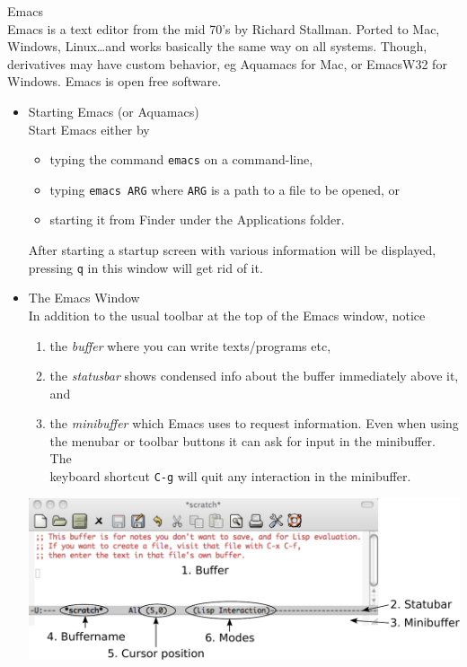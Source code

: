 \documentclass[a4,landscape]{seminar}
\begin{document}
\begin{slide}
  {\Large Emacs}\\[1ex]
  Emacs is a text editor from the mid 70's by Richard Stallman. Ported to Mac, Windows, Linux\dots and works basically the same way on all systems. Though, derivatives may have custom behavior, eg Aquamacs for Mac, or EmacsW32 for Windows. Emacs is open free software.
\begin{itemize}
  \item Starting Emacs (or Aquamacs)\\[1ex]
    Start Emacs either by
    \begin{itemize}
    \item typing the command \texttt{emacs} on a command-line,
    \item typing \texttt{emacs ARG} where \texttt{ARG} is a path to a file to be opened, or
    \item starting it from Finder under the Applications folder.
    \end{itemize}
    After starting a startup screen with various information will be
    displayed, pressing \texttt{q} in this window will get rid of it.
    \clearpage{}
  \item The Emacs Window\\[1ex]
    In addition to the usual toolbar at the top of the Emacs window, notice
    \begin{enumerate}
    \item the \emph{buffer} where you can write texts/programs etc,
    \item the \emph{statusbar} shows condensed info about the buffer immediately above it, and
    \item the \emph{minibuffer} which Emacs uses to request information. Even when using the menubar or toolbar buttons it can ask for input in the minibuffer. The\\keyboard shortcut \texttt{C-g} will quit any interaction in the minibuffer.
    \end{enumerate}\vspace{5mm}
    \begin{center}
      \includegraphics[scale=.55]{emacs-image.pdf}

\end{center}
\end{itemize}
\end{slide}
\end{document}
